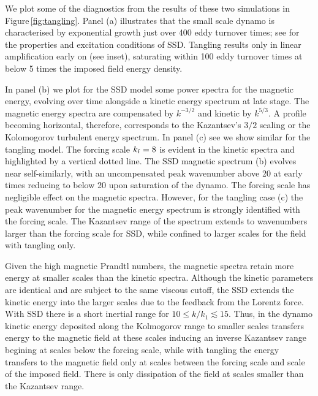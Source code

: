 \documentclass[preprint2]{aastex63}
\newcommand\kf{k_{\rm f} }
\newcommand{\ns}[1]{\textcolor{orange}{#1}}
\begin{document}
We plot some of the diagnostics from the results of these two simulations in 
Figure\,\ref{fig:tangling}.
Panel (a) illustrates that the small scale dynamo is characterised by
exponential growth just over 400 eddy turnover times; see \cite{ZRS83} for the
properties and excitation conditions of SSD.
Tangling results only in linear amplification early on (see inset), saturating
within 100 eddy turnover times at below 5 times the imposed field energy
density.

In panel (b) we plot for the SSD model some power spectra for the magnetic
energy, evolving over time alongside a kinetic energy spectrum at late stage.
The magnetic energy spectra are compensated by $k^{-3/2}$ and kinetic by
$k^{5/3}$.
A profile becoming horizontal, therefore, corresponds to the Kazantsev's
$3/2$ scaling \citep{Sch02,BS14} or the Kolomogorov turbulent energy spectrum.
In panel (c) see we show similar for the tangling model.
The forcing scale $\kf=8$ is evident in the kinetic spectra and highlighted by 
a vertical dotted line.
The SSD magnetic spectrum (b) evolves near self-similarly, with an uncompensated
peak wavenumber above 20 at early times reducing to below 20 upon saturation of
the dynamo.
The forcing scale has negligible effect on the magnetic spectra.
However, for the tangling case (c) the peak wavenumber for the magnetic energy
spectrum is strongly identified with the forcing scale.
The Kazantsev range of the spectrum extends to wavenumbers larger than the 
forcing scale for SSD, while confined to larger scales for the field with
tangling only.


Given the high magnetic Prandtl numbers, the magnetic spectra retain more energy
at smaller scales than the kinetic spectra.
Although the kinetic parameters are identical and are subject to the same 
viscous cutoff, the SSD extends the kinetic energy into the larger scales
due to the feedback from the Lorentz force.
With SSD there is a short inertial range for $10\leq k/k_1\lesssim 15$.
Thus, in the dynamo kinetic energy deposited along the Kolmogorov range to
smaller scales transfers energy to the magnetic field at these scales
inducing an inverse Kazantsev range begining at scales below the forcing
scale, while with tangling the energy transfers to the magnetic field
only at scales between the forcing scale and scale of the imposed field.
There is only dissipation of the field at scales smaller than the Kazantsev 
range.
\end{document}
